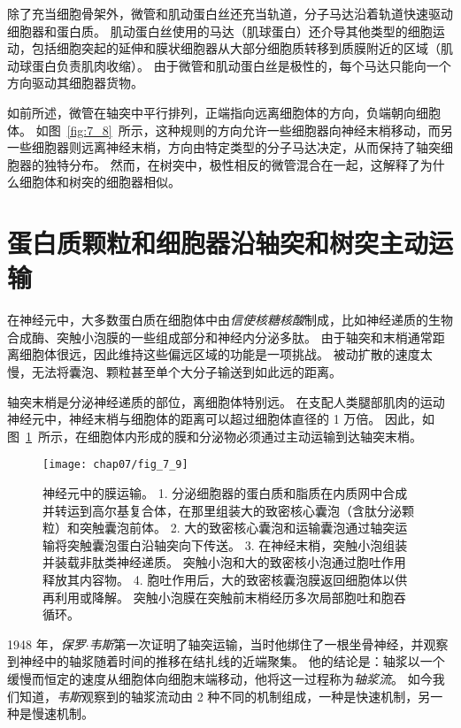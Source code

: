 除了充当细胞骨架外，微管和肌动蛋白丝还充当轨道，分子马达沿着轨道快速驱动细胞器和蛋白质。
肌动蛋白丝使用的马达（肌球蛋白）还介导其他类型的细胞运动，包括细胞突起的延伸和膜状细胞器从大部分细胞质转移到质膜附近的区域（肌动球蛋白负责肌肉收缩）。
由于微管和肌动蛋白丝是极性的，每个马达只能向一个方向驱动其细胞器货物。


如前所述，微管在轴突中平行排列，正端指向远离细胞体的方向，负端朝向细胞体。
如图~\ref{fig:7_8}~所示，这种规则的方向允许一些细胞器向神经末梢移动，而另一些细胞器则远离神经末梢，方向由特定类型的分子马达决定，从而保持了轴突细胞器的独特分布。
然而，在树突中，极性相反的微管混合在一起，这解释了为什么细胞体和树突的细胞器相似。




\section{蛋白质颗粒和细胞器沿轴突和树突主动运输}

在神经元中，大多数蛋白质在细胞体中由\textit{信使核糖核酸}制成，比如神经递质的生物合成酶、突触小泡膜的一些组成部分和神经内分泌多肽。
由于轴突和末梢通常距离细胞体很远，因此维持这些偏远区域的功能是一项挑战。
被动扩散的速度太慢，无法将囊泡、颗粒甚至单个大分子输送到如此远的距离。


轴突末梢是分泌神经递质的部位，离细胞体特别远。
在支配人类腿部肌肉的运动神经元中，神经末梢与细胞体的距离可以超过细胞体直径的 1 万倍。
因此，如图~\ref{fig:7_9}~所示，在细胞体内形成的膜和分泌物必须通过主动运输到达轴突末梢。


\begin{figure}[htbp]
	\centering
	\texttt{[image: chap07/fig\_7\_9]}
	\caption{神经元中的膜运输。
		1. 分泌细胞器的蛋白质和脂质在内质网中合成并转运到高尔基复合体，在那里组装大的致密核心囊泡（含肽分泌颗粒）和突触囊泡前体。
		2. 大的致密核心囊泡和运输囊泡通过轴突运输将突触囊泡蛋白沿轴突向下传送。
		3. 在神经末梢，突触小泡组装并装载非肽类神经递质。
		突触小泡和大的致密核小泡通过胞吐作用释放其内容物。
		4. 胞吐作用后，大的致密核囊泡膜返回细胞体以供再利用或降解。
		突触小泡膜在突触前末梢经历多次局部胞吐和胞吞循环。}
	\label{fig:7_9}
\end{figure}


1948 年，\textit{保罗$\cdot$韦斯}第一次证明了轴突运输，当时他绑住了一根坐骨神经，并观察到神经中的轴浆随着时间的推移在结扎线的近端聚集。
他的结论是：轴浆以一个缓慢而恒定的速度从细胞体向细胞末端移动，他将这一过程称为\textit{轴浆流}。
如今我们知道，\textit{韦斯}观察到的轴浆流动由 2 种不同的机制组成，一种是快速机制，另一种是慢速机制。


